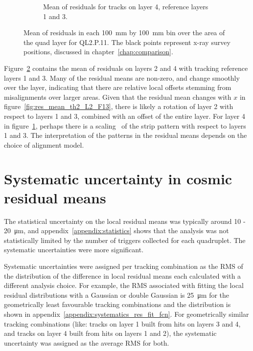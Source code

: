 \begin{figure}
\begin{subfigure}{0.85\textwidth}
  \caption{Mean of residuals for tracks on layer 4, reference layers 1 and 3.}
  \label{fig:res_mean_th2_L4_F13}
\end{subfigure}
\caption{Mean of residuals in each \SI{100}{\milli\meter} by \SI{100}{\milli\meter} bin over the area of the quad layer for QL2.P.11. The black points represent x-ray survey positions, discussed in chapter~\ref{chap:comparison}.}
\label{fig:res_mean_th2}
\end{figure}

Figure~\ref{fig:res_mean_th2} contains the mean of residuals on layers 2 and 4 with tracking reference layers 1 and 3. Many of the residual means are non-zero, and change smoothly over the layer, indicating that there are relative local offsets stemming from misalignments over larger areas. Given that the residual mean changes with $x$ in figure~\ref{fig:res_mean_th2_L2_F13}, there is likely a rotation of layer 2 with respect to layers 1 and 3, combined with an offset of the entire layer. For layer 4 in figure~\ref{fig:res_mean_th2_L4_F13}, perhaps there is a scaling~\cite{carlson_results_2019} of the strip pattern with respect to layers 1 and 3. The interpretation of the patterns in the residual means depends on the choice of alignment model.

\section{Systematic uncertainty in cosmic residual means}

The statistical uncertainty on the local residual means was typically around \SI{10}{} - \SI{20}{\micro\meter}, and appendix~\ref{appendix:statistics} shows that the analysis was not statistically limited by the number of triggers collected for each quadruplet. The systematic uncertainties were more significant. 

Systematic uncertainties were assigned per tracking combination as the RMS of the distribution of the difference in local residual means each calculated with a different analysis choice. For example, the RMS associated with fitting the local residual distributions with a Gaussian or double Gaussian is \SI{25}{\micro\meter} for the geometrically least favourable tracking combinations and the distribution is shown in appendix~\ref{appendix:systematics_res_fit_fcn}. For geometrically similar tracking combinations (like: tracks on layer 1 built from hits on layers 3 and 4, and tracks on layer 4 built from hits on layers 1 and 2), the systematic uncertainty was assigned as the average RMS for both.

